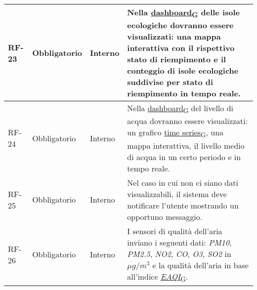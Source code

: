 \begin{longtable}{|>{\centering\arraybackslash}m{}|>{\centering\arraybackslash}m{}|>{\centering\arraybackslash}m{}|>{\centering\arraybackslash}m{}|}
	RF-23           & Obbligatorio        & Interno                                                                                                           & Nella \href{https://7last.github.io/docs/rtb/documentazione-interna/glossario\#dashboard}{dashboard\textsubscript{G}} delle isole ecologiche dovranno essere visualizzati: una mappa interattiva con il rispettivo stato di riempimento e il conteggio di isole ecologiche suddivise per stato di riempimento in tempo reale.                                                                                                                                                                        \\\hline
	RF-24           & Obbligatorio        & Interno                                                                                                           & Nella \href{https://7last.github.io/docs/rtb/documentazione-interna/glossario\#dashboard}{dashboard\textsubscript{G}} del livello di acqua dovranno essere visualizzati: un grafico \href{https://7last.github.io/docs/rtb/documentazione-interna/glossario\#time-series}{time series\textsubscript{G}}, una mappa interattiva, il livello medio di acqua in un certo periodo e in tempo reale.                                                                                                      \\\hline
	RF-25           & Obbligatorio        & Interno                                                                                                           & Nel caso in cui non ci siano dati visualizzabili, il sistema deve notificare l'utente mostrando un opportuno messaggio.                                                                                                                                                                                                                                                                                                                                                                              \\\hline
	RF-26           & Obbligatorio        & Interno                                                                                                           & I sensori di qualità dell'aria inviano i seguenti dati: \textit{PM10}, \textit{PM2.5}, \textit{NO2}, \textit{CO}, \textit{O3}, \textit{SO2} in $\mu g/m^3$ e la qualità dell'aria in base all'indice \href{https://7last.github.io/docs/rtb/documentazione-interna/glossario\#european-air-quality-index}{\textit{EAQI}\textsubscript{G}}.                                                                                                                                                           \\\hline

\end{longtable}
